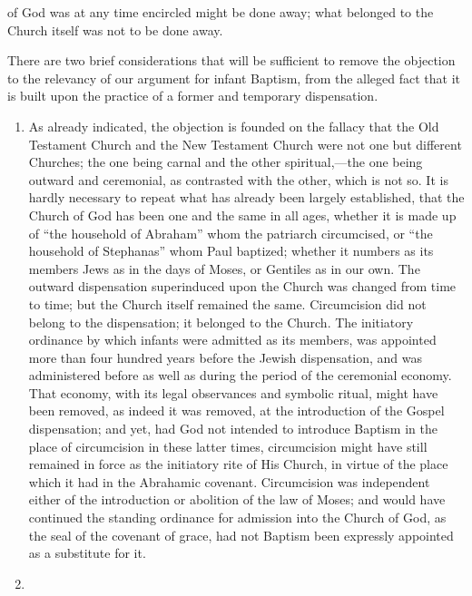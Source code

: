 \documentclass[]{book}
\begin{document}
of God was at any time encircled might be done away; what belonged to the Church itself was not to be done away.

There are two brief considerations that will be sufficient to remove the objection to the relevancy of our argument for infant Baptism, from the alleged fact that it is built upon the practice of a former and temporary dispensation.

\begin{enumerate}
\def\labelenumi{\arabic{enumi}.}
\item
  As already indicated, the objection is founded on the fallacy that the Old Testament Church and the New Testament Church were not one but different Churches; the one being carnal and the other spiritual,---the one being outward and ceremonial, as contrasted with the other, which is not so. It is hardly necessary to repeat what has already been largely established, that the Church of God has been one and the same in all ages, whether it is made up of ``the household of Abraham'' whom the patriarch circumcised, or ``the household of Stephanas'' whom Paul baptized; whether it numbers as its members Jews as in the days of Moses, or Gentiles as in our own. The outward dispensation superinduced upon the Church was changed from time to time; but the Church itself remained the same. Circumcision did not belong to the dispensation; it belonged to the Church. The initiatory ordinance by which infants were admitted as its members, was appointed more than four hundred years before the Jewish dispensation, and was administered before as well as during the period of the ceremonial economy. That economy, with its legal observances and symbolic ritual, might have been removed, as indeed it was removed, at the introduction of the Gospel dispensation; and yet, had God not intended to introduce Baptism in the place of circumcision in these latter times, circumcision might have still remained in force as the initiatory rite of His Church, in virtue of the place which it had in the Abrahamic covenant. Circumcision was independent either of the introduction or abolition of the law of Moses; and would have continued the standing ordinance for admission into the Church of God, as the seal of the covenant of grace, had not Baptism been expressly appointed as a substitute for it.
\item

\end{enumerate}
\end{document}
